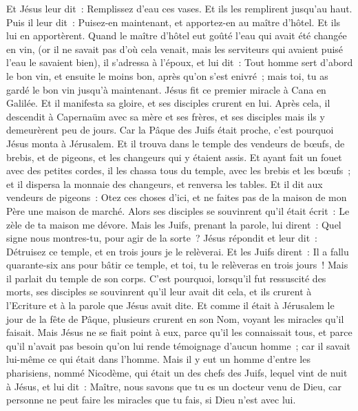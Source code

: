 \begin{multicols}{2}
Et Jésus leur dit~: Remplissez d'eau ces vases. Et ils les remplirent jusqu'au haut.
Puis il leur dit~: Puisez-en maintenant, et apportez-en au maître d'hôtel. Et ils lui en apportèrent.
Quand le maître d'hôtel eut goûté l'eau qui avait été changée en vin, (or il ne savait pas d'où cela venait, mais les serviteurs qui avaient puisé l'eau le savaient bien), il s'adressa à l'époux,
et lui dit~: Tout homme sert d'abord le bon vin, et ensuite le moins bon, après qu'on s'est enivré~; mais toi, tu as gardé le bon vin jusqu'à maintenant.
Jésus fit ce premier miracle à Cana en Galilée. Et il manifesta sa gloire, et ses disciples crurent en lui.
Après cela, il descendit à Capernaüm avec sa mère et ses frères, et ses disciples mais ils y demeurèrent peu de jours.
Car la Pâque des Juifs était proche, c'est pourquoi Jésus monta à Jérusalem.
Et il trouva dans le temple des vendeurs de bœufs, de brebis, et de pigeons, et les changeurs qui y étaient assis.
Et ayant fait un fouet avec des petites cordes, il les chassa tous du temple, avec les brebis et les bœufs~; et il dispersa la monnaie des changeurs, et renversa les tables.
Et il dit aux vendeurs de pigeons~: Otez ces choses d'ici, et ne faites pas de la maison de mon Père une maison de marché.
Alors ses disciples se souvinrent qu'il était écrit~: Le zèle de ta maison me dévore.
Mais les Juifs, prenant la parole, lui dirent~: Quel signe nous montres-tu, pour agir de la sorte~?
Jésus répondit et leur dit~: Détruisez ce temple, et en trois jours je le relèverai.
Et les Juifs dirent~: Il a fallu quarante-six ans pour bâtir ce temple, et toi, tu le relèveras en trois jours~!
Mais il parlait du temple de son corps.
C'est pourquoi, lorsqu'il fut ressuscité des morts, ses disciples se souvinrent qu'il leur avait dit cela, et ils crurent à l'Ecriture et à la parole que Jésus avait dite.
Et comme il était à Jérusalem le jour de la fête de Pâque, plusieurs crurent en son Nom, voyant les miracles qu'il faisait.
Mais Jésus ne se fiait point à eux, parce qu'il les connaissait tous,
et parce qu'il n'avait pas besoin qu'on lui rende témoignage d'aucun homme~; car il savait lui-même ce qui était dans l'homme.
\VerseOne{}Mais il y eut un homme d'entre les pharisiens, nommé Nicodème, qui était un des chefs des Juifs,
lequel vint de nuit à Jésus, et lui dit~: Maître, nous savons que tu es un docteur venu de Dieu, car personne ne peut faire les miracles que tu fais, si Dieu n'est avec lui.

\end{multicols}
